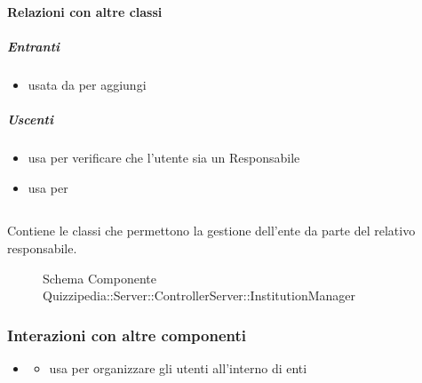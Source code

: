\paragraph{Relazioni con altre classi}
\subparagraph{Entranti}
\begin{itemize}
\item usata da  per aggiungi
\end{itemize}
\subparagraph{Uscenti}
\begin{itemize}
\item usa  per verificare che l'utente sia un Responsabile
\item usa  per 
\end{itemize}
\subsection{}
Contiene le classi che permettono la gestione dell'ente da parte del relativo responsabile.
\begin{figure}[H]
\centering
\noindent{}
\caption[Schema Componente Quizzipedia::Server::ControllerServer::InstitutionManager]{Schema Componente Quizzipedia::Server::ControllerServer::InstitutionManager}
\end{figure}
\subsubsection{Interazioni con altre componenti}
\begin{itemize}
\item {}
\begin{itemize}
\item usa  per organizzare gli utenti all'interno di enti
\end{itemize}
\end{itemize}
